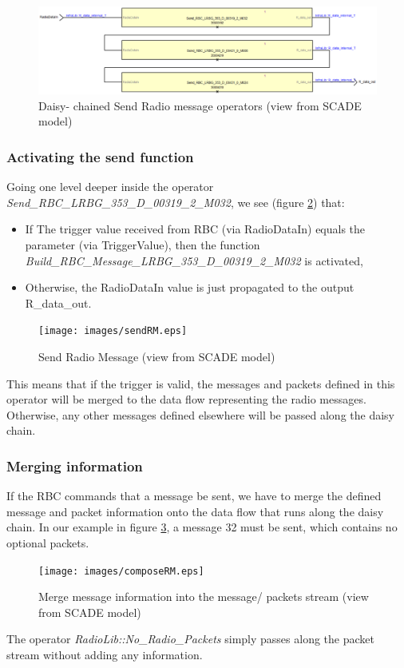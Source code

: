 \documentclass{template/openetcs_article}
\begin{document}
\begin{figure}[H]
  \centering
  \includegraphics[width=6.5in]{images/rbcchain.eps}
   \caption{Daisy- chained Send Radio message operators (view from SCADE model)}
  \label{fig:rbcchain}
\end{figure}
\subsubsection{Activating the send function}
Going one level deeper inside the operator \emph{Send\_RBC\_LRBG\_353\_D\_00319\_2\_M032}, we see (figure \ref{fig:sendRM}) that:
\begin{itemize}
 \item If The trigger value received from RBC (via RadioDataIn) equals the parameter (via TriggerValue), then the function \emph{Build\_RBC\_Message\_LRBG\_353\_D\_00319\_2\_M032} is activated,
 \item Otherwise, the RadioDataIn value is just propagated to the output R\_data\_out.
\end{itemize}
\begin{figure}[H]
  \centering
  \texttt{[image: images/sendRM.eps]}
   \caption{Send Radio Message (view from SCADE model)}
  \label{fig:sendRM}
\end{figure}
This means that if the trigger is valid, the messages and packets defined in this operator will be merged to the data flow representing the radio messages. Otherwise, any other messages defined elsewhere will be passed along the daisy chain.\newline

\subsubsection{Merging information}

If the RBC commands that a message be sent, we have to merge the defined message and packet information onto the data flow that runs along the daisy chain. In our example in figure \ref{fig:composeRM}, a message 32 must be sent, which contains no optional packets.
\begin{figure}[H]
  \centering
  \texttt{[image: images/composeRM.eps]}
   \caption{Merge message information into the message/ packets stream (view from SCADE model)}
  \label{fig:composeRM}
\end{figure}
The operator \emph{RadioLib::No\_Radio\_Packets} simply passes along the packet stream without adding any information. \newline
\end{document}
